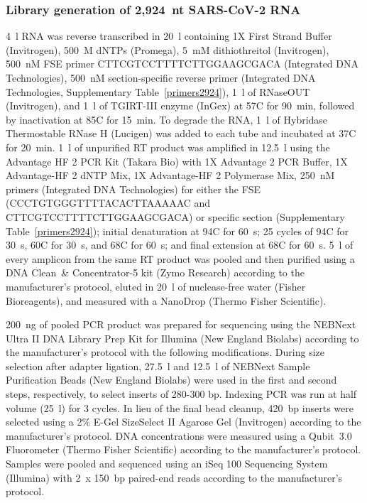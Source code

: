 \documentclass[main.tex]{subfiles}
\begin{document}
\subsubsection{Library generation of 2,924~nt SARS-CoV-2 RNA}

4~\textmu l RNA was reverse transcribed in 20~\textmu l containing 1X First Strand Buffer (Invitrogen), 500~\textmu M dNTPs (Promega), 5~mM dithiothreitol (Invitrogen), 500~nM FSE primer CTTCGTCCTTTTCTTGGAAGCGACA (Integrated DNA Technologies), 500~nM section-specific reverse primer (Integrated DNA Technologies, Supplementary Table~\ref{primers2924}), 1~\textmu l of RNaseOUT (Invitrogen), and 1~\textmu l of TGIRT-III enzyme (InGex) at 57\textdegree C for 90~min, followed by inactivation at 85\textdegree C for 15~min.
To degrade the RNA, 1~\textmu l of Hybridase Thermostable RNase H (Lucigen) was added to each tube and incubated at 37\textdegree C for 20~min.
1~\textmu l of unpurified RT product was amplified in 12.5~\textmu l using the Advantage HF 2 PCR Kit (Takara Bio) with 1X Advantage 2 PCR Buffer, 1X Advantage-HF 2 dNTP Mix, 1X Advantage-HF 2 Polymerase Mix, 250~nM primers (Integrated DNA Technologies) for either the FSE (CCCTGTGGGTTTTACACTTAAAAAC and CTTCGTCCTTTTCTTGGAAGCGACA) or specific section (Supplementary Table~\ref{primers2924}); initial denaturation at 94\textdegree C for 60~s; 25 cycles of 94\textdegree C for 30~s, 60\textdegree C for 30~s, and 68\textdegree C for 60~s; and final extension at 68\textdegree C for 60~s.
5~\textmu l of every amplicon from the same RT product was pooled and then purified using a DNA Clean~\& Concentrator-5 kit (Zymo Research) according to the manufacturer's protocol, eluted in 20~\textmu l of nuclease-free water (Fisher Bioreagents), and measured with a NanoDrop (Thermo Fisher Scientific).

200~ng of pooled PCR product was prepared for sequencing using the NEBNext Ultra II DNA Library Prep Kit for Illumina (New England Biolabs) according to the manufacturer's protocol with the following modifications.
During size selection after adapter ligation, 27.5~\textmu l and 12.5~\textmu l of NEBNext Sample Purification Beads (New England Biolabs) were used in the first and second steps, respectively, to select inserts of 280-300 bp.
Indexing PCR was run at half volume (25~\textmu l) for 3 cycles.
In lieu of the final bead cleanup, 420~bp inserts were selected using a 2\% E-Gel SizeSelect II Agarose Gel (Invitrogen) according to the manufacturer's protocol.
DNA concentrations were measured using a Qubit~3.0 Fluorometer (Thermo Fisher Scientific) according to the manufacturer's protocol.
Samples were pooled and sequenced using an iSeq 100 Sequencing System (Illumina) with 2~x 150~bp paired-end reads according to the manufacturer's protocol.
\end{document}
